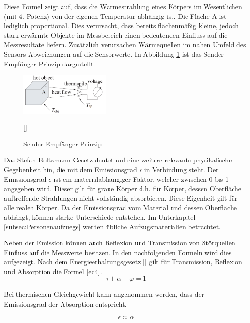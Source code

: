 Diese Formel zeigt auf, dass die Wärmestrahlung eines Körpers im Wesentlichen (mit 4. Potenz) von der eigenen Temperatur abhängig ist. 
Die Fläche A ist lediglich proportional. Dies verursacht, dass bereits flächenmäßig kleine, jedoch stark erwärmte Objekte im Messbereich einen bedeutenden Einfluss auf die Messresultate liefern. Zusätzlich verursachen Wärmequellen im nahen Umfeld des Sensors Abweichungen auf die Sensorwerte. In Abbildung \ref{fig:thermosäule} ist das Sender-Empfänger-Prinzip dargestellt.

\begin{figure}[H]
	\centering
	\includegraphics[width=0.4\textwidth]
	{fig/seebeck2.PNG}
	\caption[Sender-Empfänger-Prinzip]{Sender-Empfänger-Prinzip} [\protect\cite{seebeck}]
	\label{fig:thermosäule}
\end{figure}


Das Stefan-Boltzmann-Gesetz deutet auf eine weitere relevante physikalische Gegebenheit hin, die mit dem Emissionsgrad $\epsilon$  in Verbindung steht.
 Der Emissionsgrad $\epsilon$ ist ein materialabhängiger Faktor, welcher zwischen 0 bis 1  angegeben wird. Dieser gilt für graue Körper d.h. für Körper, dessen Oberfläche auftreffende Strahlungen nicht vollständig absorbieren. Diese Eigenheit gilt für alle realen Körper. Da der Emissionsgrad vom Material und dessen Oberfläche abhängt, können starke Unterschiede entstehen. Im Unterkapitel \ref{subsec:Personenaufzuege} werden übliche Aufzugsmaterialien betrachtet.

Neben der Emission können auch Reflexion und Transmission von Störquellen Einfluss auf die Messwerte besitzen. In den nachfolgenden Formeln wird dies aufgezeigt. Nach dem Energieerhaltungsgesetz [\protect\cite{Thermoformeln}] gilt für Transmission, Reflexion und Absorption die Formel \ref{eq4}.
\begin{equation}
\label{eq4}
\tau  + \alpha + \varphi  = 1
\end{equation}

Bei thermischen Gleichgewicht kann angenommen werden, dass der Emissionsgrad der Absorption entspricht.

\begin{equation}
\label{eq5}
\epsilon \approx  \alpha
\end{equation}

